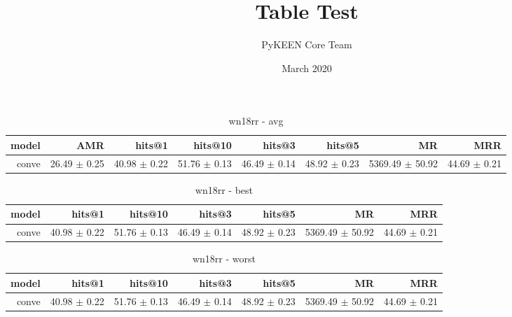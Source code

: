 \documentclass{article}
\title{Table Test}
\author{PyKEEN Core Team}
\date{March 2020}
\begin{document}
    
    \begin{table}
\centering
\caption{wn18rr - avg}
\begin{tabular}{rrrrrrrr}
\toprule
 model &           AMR &        hits@1 &       hits@10 &        hits@3 &        hits@5 &               MR &           MRR \\
\midrule
 conve &  26.49 $\pm$ 0.25 &  40.98 $\pm$ 0.22 &  51.76 $\pm$ 0.13 &  46.49 $\pm$ 0.14 &  48.92 $\pm$ 0.23 &  5369.49 $\pm$ 50.92 &  44.69 $\pm$ 0.21 \\
\bottomrule
\end{tabular}
\end{table}

    
    \begin{table}
\centering
\caption{wn18rr - best}
\begin{tabular}{rrrrrrr}
\toprule
 model &        hits@1 &       hits@10 &        hits@3 &        hits@5 &               MR &           MRR \\
\midrule
 conve &  40.98 $\pm$ 0.22 &  51.76 $\pm$ 0.13 &  46.49 $\pm$ 0.14 &  48.92 $\pm$ 0.23 &  5369.49 $\pm$ 50.92 &  44.69 $\pm$ 0.21 \\
\bottomrule
\end{tabular}
\end{table}

    
    \begin{table}
\centering
\caption{wn18rr - worst}
\begin{tabular}{rrrrrrr}
\toprule
 model &        hits@1 &       hits@10 &        hits@3 &        hits@5 &               MR &           MRR \\
\midrule
 conve &  40.98 $\pm$ 0.22 &  51.76 $\pm$ 0.13 &  46.49 $\pm$ 0.14 &  48.92 $\pm$ 0.23 &  5369.49 $\pm$ 50.92 &  44.69 $\pm$ 0.21 \\
\bottomrule
\end{tabular}
\end{table}

    
\end{document}
